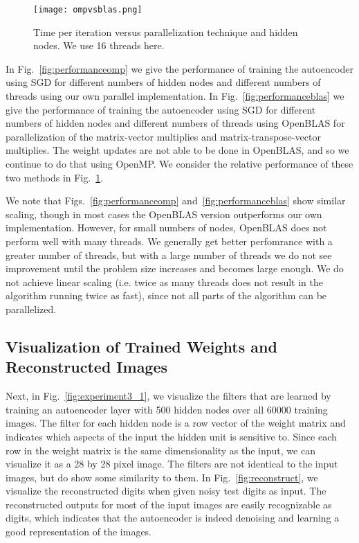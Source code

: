 \begin{figure}[h]
\centering
\texttt{[image: ompvsblas.png]}
\caption{Time per iteration versus parallelization technique and hidden nodes. We use 16 threads here.}
\label{fig:ompvsblas}
\end{figure}

In  Fig.~\ref{fig:performanceomp} we give the performance of training the autoencoder using SGD for different numbers of hidden nodes and different numbers of threads using our own parallel implementation.
In  Fig.~\ref{fig:performanceblas} we give the performance of training the autoencoder using SGD for different numbers of hidden nodes and different numbers of threads using OpenBLAS for parallelization of the matrix-vector multiplies and matrix-transpose-vector multiplies. The weight updates are not able to be done in OpenBLAS, and so we continue to do that using OpenMP. We consider the relative performance of these two methods in Fig.~\ref{fig:ompvsblas}.

We note that Figs.~\ref{fig:performanceomp} and~\ref{fig:performanceblas} show similar scaling, though in most cases the OpenBLAS version outperforms our own implementation. However, for small numbers of nodes, OpenBLAS does not perform well with many threads.
We generally get better perfomrance with a greater number of threads, but with a large number of threads we do not see improvement until the problem size increases and becomes large enough. We do not achieve linear scaling (i.e. twice as many threads does not result in the algorithm running twice as fast), since not all parts of the algorithm can be parallelized. 

\subsection{Visualization of Trained Weights and Reconstructed Images}

Next, in Fig.~\ref{fig:experiment3_1}, we visualize the filters that are
learned by training an autoencoder layer with 500 hidden nodes over all 60000
training images. The  filter for each hidden node is a row vector of the weight
matrix and indicates which aspects of the input the hidden unit is sensitive
to. Since each row in the weight matrix is the same dimensionality as the
input, we can visualize it as a 28 by 28 pixel image. The filters are not
identical to the input images, but do show some similarity to them. In
Fig.~\ref{fig:reconstruct}, we visualize the reconstructed digits when given
noisy test digits as input. The reconstructed outputs for most of the input
images are easily recognizable as digits, which indicates that the autoencoder
is indeed denoising and learning a good representation of the images.

